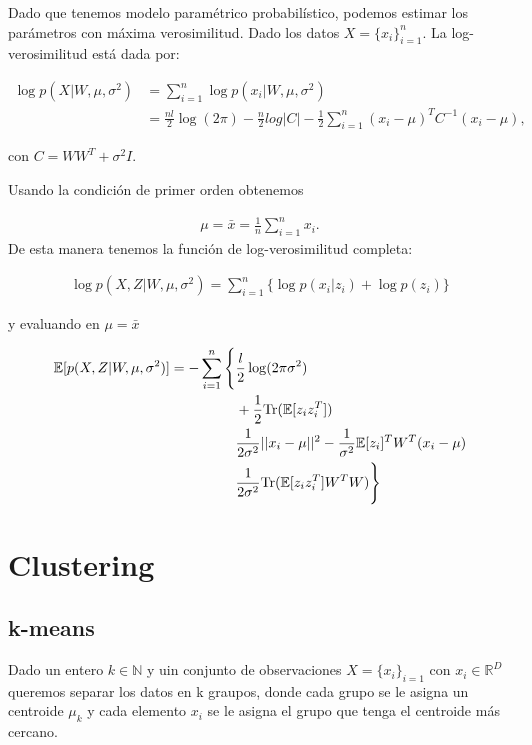 Dado que tenemos modelo paramétrico probabilístico, podemos estimar los parámetros con máxima verosimilitud. Dado los datos $X = \{x_i\}_{i=1}^n$. La log-verosimilitud está dada por:

\begin{align}
\log p(X|W,\mu, \sigma^2) & = \sum_{i=1}^n \log p(x_i|W,\mu, \sigma^2)\\
& = \frac{n l}{2}\log (2\pi) - \frac{n}{2}log|C| - \frac{1}{2}\sum_{i=1}^n (x_i-\mu)^T C^{-1} (x_i-\mu),
\end{align}

con $C = WW^T + \sigma^2 I$.

Usando la condición de primer orden obtenemos

\begin{align}
\mu = \bar{x} = \frac{1}{n}\sum_{i=1}^n x_i.
\end{align}
De esta manera tenemos la función de log-verosimilitud completa:

\begin{align}
    \log p(X, Z|W, \mu, \sigma^2) = \sum_{i=1}^n \{\log p(x_i|z_i) + \log p(z_i)\}
\end{align}

y evaluando en $\mu = \bar{x}$

\begin{align}
\notag \mathbb{E}[ p(X,Z |W, \mu, \sigma^2) ] =  -\sum_{i=1}^n \Bigg\{ &\frac{l}{2} \log (2\pi \sigma^2)\\
\notag & + \frac{1}{2}\text{Tr}(\mathbb{E}[z_iz_i^T])\\
\notag & \frac{1}{2\sigma^2}||x_i - \mu||^2 - \frac{1}{\sigma^2}\mathbb{E}[z_i]^T W^T (x_i - \mu)\\
& \frac{1}{2\sigma^2} \text{Tr}(\mathbb{E}[z_iz_i^T]W^T W) \Bigg\}
\end{align}



\section{Clustering}

\subsection{k-means}
Dado un entero $k \in \mathbb{N}$ y uin conjunto de observaciones $X = \{x_i\}_{i=1}$ con $x_i\in \mathbb{R}^D$ queremos separar los datos en k graupos, donde cada grupo se le asigna un centroide $\mu_k$ y cada elemento $x_i$ se le asigna el grupo que tenga el centroide más cercano.

